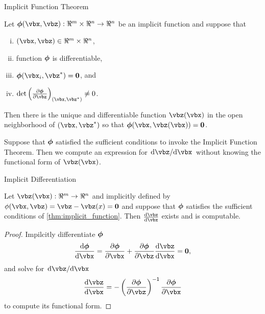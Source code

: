 \documentclass[8pt,aspectratio=169]{beamer}
\begin{document}
\begin{frame}[fragile]{Implicit Function Theorem}
  \begin{theorem}
    \label{thm:implicit_function}
    Let $\vbphi(\vbx,\vbz): \Re^m \times \Re^n \to \Re^n$ be an
    implicit function and suppose that
    \begin{enumerate}[(i)]
    \item $(\vbx,\vbz) \in \Re^m\times\Re^n$,
    \item function $\bm{\phi}$ is differentiable,
    \item $\vbphi(\vbx_i,\vbz^*)=\vbzero$, and
    \item $\det \pdv{\vbphi}{\vbz}_{(\vbx,\vbz^*)} \neq 0$.
    \end{enumerate}
    Then there is the unique and differentiable function $\vbz(\vbx)$ in the open neighborhood of
    $(\vbx,\vbz^*)$ so that $\vbphi(\vbx, \vbz(\vbx))=\vbzero$.
  \end{theorem}

  \smallskip
  
  \begin{remark}
    Suppose that $\bm{\phi}$ satisfied the sufficient conditions to
    invoke the Implicit Function Theorem. Then we compute an expression
    for $\odv{\vbz}/{\vbx}$ without knowing the functional form of
    $\vbz(\vbx)$. 
  \end{remark}
\end{frame}

\begin{frame}{Implicit Differentiation}
  \begin{theorem}
    \label{corr:implicit_diff}
    Let $\vbz(\vbx): \Re^m \to \Re^n$ and implicitly defined by
    $\phi(\vbx,\vbz)=\vbz-\vbz(x)=\vbzero$ and suppose that $\bm{\phi}$ satisfies the sufficient
    conditions of \eqref{thm:implicit_function}. Then $\odv{\vbz}{\vbx}$
    exists and is computable.
  \end{theorem}

  \begin{proof}
  Impilcitly differentiate $\bm{\phi}$
  \[
    \odv{\vbphi}{\vbx} = \pdv{\vbphi}{\vbx}+\pdv{\vbphi}{\vbz}\odv{\vbz}{\vbx} = \vbzero,
  \]
  and solve for $\odv{\vbz}/{\vbx}$
  \[
    \odv{\vbz}{\vbx} = -\pdv{\vbphi}{\vbz}^{\inv}\pdv{\vbphi}{\vbx}
  \]
  to compute its functional form.
\end{proof}
\end{frame}
\end{document}

